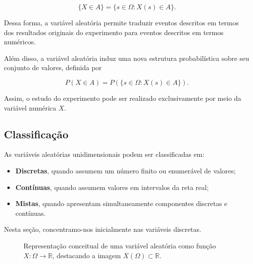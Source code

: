 \[
\{X \in A\} = \{ s \in \Omega : X(s)\in A \}.
\]

Dessa forma, a variável aleatória permite traduzir eventos descritos em termos dos resultados originais do experimento para eventos descritos em termos numéricos.

Além disso, a variável aleatória induz uma nova estrutura probabilística sobre seu conjunto de valores, definida por

\[
P(X \in A) = P(\{ s \in \Omega : X(s)\in A \}).
\]

Assim, o estudo do experimento pode ser realizado exclusivamente por meio da variável numérica $X$.

\subsection{Classificação}

As variáveis aleatórias unidimensionais podem ser classificadas em:

\begin{itemize}
    \item \textbf{Discretas}, quando assumem um número finito ou enumerável de valores;
    \item \textbf{Contínuas}, quando assumem valores em intervalos da reta real;
    \item \textbf{Mistas}, quando apresentam simultaneamente componentes discretas e contínuas.
\end{itemize}

Nesta seção, concentramo-nos inicialmente nas variáveis discretas.

\begin{figure}[H]
\centering
{}
\caption{Representação conceitual de uma variável aleatória como função $X:\Omega \rightarrow \mathbb{R}$, destacando a imagem $X(\Omega)\subset\mathbb{R}$.}
\end{figure}

